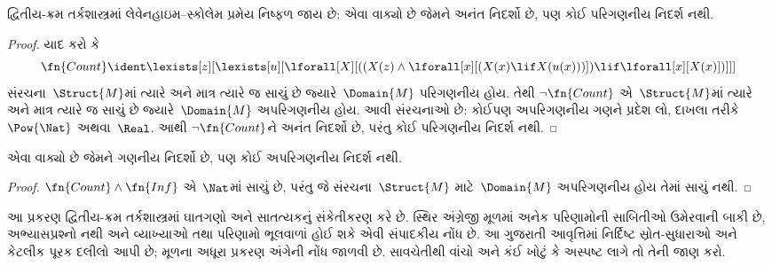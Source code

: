 \begin{thm}
 દ્વિતીય-ક્રમ તર્કશાસ્ત્રમાં લેવેનહાઇમ--સ્કોલેમ
પ્રમેય નિષ્ફળ જાય છે: એવા વાક્યો છે જેમને અનંત નિદર્શો છે,
પણ કોઈ પરિગણનીય નિદર્શ નથી.
\end{thm}

\begin{proof}
યાદ કરો કે
\[
\fn{Count} \ident \lexists[z][\lexists[u][\lforall[X][((X(z) \land
      \lforall[x][(X(x) \lif X(u(x)))]) \lif \lforall[x][X(x)])]]]
\]
સંરચના~$\Struct{M}$માં ત્યારે અને માત્ર ત્યારે જ સાચું છે
જ્યારે~$\Domain{M}$ પરિગણનીય હોય. તેથી
$\lnot\fn{Count}$ એ~$\Struct{M}$માં ત્યારે અને માત્ર ત્યારે જ
સાચું છે જ્યારે~$\Domain{M}$ અપરિગણનીય હોય. આવી
સંરચનાઓ છે: કોઈપણ અપરિગણનીય ગણને પ્રદેશ લો,
દાખલા તરીકે $\Pow{\Nat}$ અથવા~$\Real$. આથી
$\lnot \fn{Count}$ને અનંત નિદર્શો છે, પરંતુ કોઈ
પરિગણનીય નિદર્શ નથી.
\end{proof}

\begin{thm}
એવા વાક્યો છે જેમને ગણનીય નિદર્શો છે,
પણ કોઈ અપરિગણનીય નિદર્શ નથી.
\end{thm}

\begin{proof}
$\fn{Count} \land \fn{Inf}$ એ~$\Nat$માં સાચું છે, પરંતુ
જે સંરચના~$\Struct{M}$ માટે~$\Domain{M}$
અપરિગણનીય હોય તેમાં સાચું નથી.
\end{proof}
\endgroup


\OLEndChapterHook
\endgroup


\begingroup
\makeatletter{}\makeatother

\label{guunit:OLP-0336}


\begin{editorial}
આ પ્રકરણ દ્વિતીય-ક્રમ તર્કશાસ્ત્રમાં ઘાતગણો અને સાતત્યકનું
સંકેતીકરણ કરે છે. સ્થિર અંગ્રેજી મૂળમાં અનેક પરિણામોની સાબિતીઓ
ઉમેરવાની બાકી છે, અભ્યાસપ્રશ્નો નથી અને વ્યાખ્યાઓ તથા પરિણામો
ભૂલવાળાં હોઈ શકે એવી સંપાદકીય નોંધ છે. આ ગુજરાતી આવૃત્તિમાં
નિર્દિષ્ટ સ્રોત-સુધારાઓ અને કેટલીક પૂરક દલીલો આપી છે; મૂળના
અધૂરા પ્રકરણ અંગેની નોંધ જાળવી છે. સાવચેતીથી વાંચો અને કંઈ
ખોટું કે અસ્પષ્ટ લાગે તો તેની જાણ કરો.
\end{editorial}

\begingroup
\makeatletter{}\makeatother


\label{guunit:OLP-0337}


